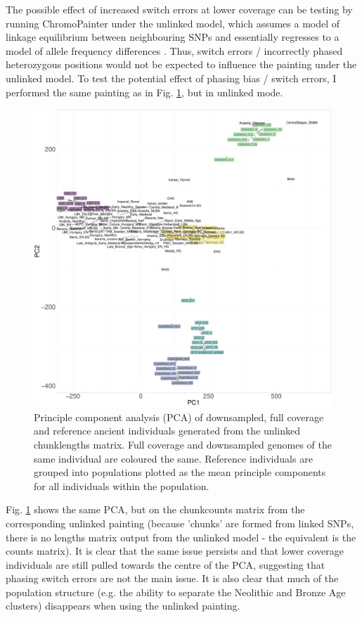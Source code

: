 The possible effect of increased switch errors at lower coverage can be testing by running ChromoPainter under the unlinked model, which assumes a model of linkage equilibrium between neighbouring SNPs and essentially regresses to a model of allele frequency differences \cite{Lawson2012}. Thus, switch errors / incorrectly phased heterozygous positions would not be expected to influence the painting under the unlinked model. To test the potential effect of phasing  bias / switch errors, I performed the same painting as in Fig. \ref{fig:PCA_panel_allInds_unlinked.allCoverage}, but in unlinked mode. 

\begin{figure}[htp]
    \centering
    \includegraphics[width=1.0\textwidth]{../images/chapter1/PCA_panel_allInds_unlinked.allCoverage.pdf}
    \caption{Principle component analysis (PCA) of downsampled, full coverage and reference ancient individuals generated from the unlinked chunklengths matrix. Full coverage and downsampled genomes of the same individual are coloured the same. Reference individuals are grouped into populations plotted as the mean principle components for all individuals within the population.}
    \label{fig:PCA_panel_allInds_unlinked.allCoverage}
\end{figure}

Fig. \ref{fig:PCA_panel_allInds_unlinked.allCoverage} shows the same PCA, but on the chunkcounts matrix from the corresponding unlinked painting (because 'chunks' are formed from linked SNPs, there is no lengths matrix output from the unlinked model - the equivalent is the counts matrix). It is clear that the same issue persists and that lower coverage individuals are still pulled towards the centre of the PCA, suggesting that phasing switch errors are not the main issue. It is also clear that much of the population structure (e.g. the ability to separate the Neolithic and Bronze Age clusters) disappears when using the unlinked painting. 

